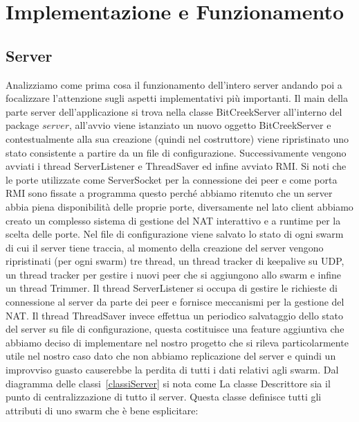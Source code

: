 \section{Implementazione e Funzionamento}

\subsection{Server}

Analizziamo come prima cosa il funzionamento dell'intero server andando poi a focalizzare l'attenzione sugli aspetti implementativi pi\`u importanti.
Il main della parte server dell'applicazione si trova nella classe BitCreekServer all'interno del package $server$, all'avvio viene istanziato un nuovo oggetto BitCreekServer e contestualmente alla sua creazione (quindi nel costruttore) viene ripristinato uno stato consistente a partire da un file di configurazione. Successivamente vengono avviati i thread ServerListener e ThreadSaver ed infine avviato RMI.
Si noti che le porte utilizzate come ServerSocket per la connessione dei peer e come porta RMI sono fissate a programma questo perch\'e abbiamo ritenuto che un server abbia piena disponibilit\`a delle proprie porte, diversamente nel lato client abbiamo creato un complesso sistema di gestione del NAT interattivo e a runtime per la scelta delle porte.
Nel file di configurazione viene salvato lo stato di ogni swarm di cui il server tiene traccia, al momento della creazione del server vengono ripristinati (per ogni swarm) tre thread, un thread tracker di keepalive su UDP, un thread tracker per gestire i nuovi peer che si aggiungono allo swarm e infine un thread Trimmer.
Il thread ServerListener si occupa di gestire le richieste di connessione al server da parte dei peer e fornisce meccanismi per la gestione del NAT.
Il thread ThreadSaver invece effettua un periodico salvataggio dello stato del server su file di configurazione, questa costituisce una feature aggiuntiva che abbiamo deciso di implementare nel nostro progetto che si rileva particolarmente utile nel nostro caso dato che non abbiamo replicazione del server e quindi un improvviso guasto causerebbe la perdita di tutti i dati relativi agli swarm. 
Dal diagramma delle classi~\ref{classiServer} si nota come La classe Descrittore sia il punto di centralizzazione di tutto il server. Questa classe definisce tutti gli attributi di uno swarm che \`e bene esplicitare:




